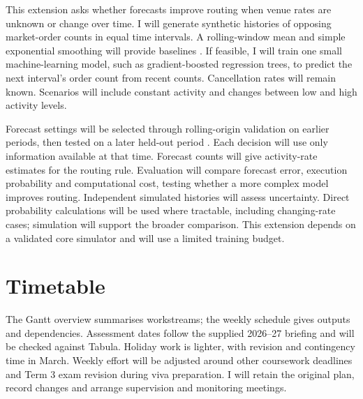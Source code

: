\documentclass[10pt,a4paper,oneside]{article}
\begin{document}
This extension asks whether forecasts improve routing when venue rates are unknown or change over time. I will generate synthetic histories of opposing market-order counts in equal time intervals. A rolling-window mean and simple exponential smoothing will provide baselines \cite{hyndman2021}. If feasible, I will train one small machine-learning model, such as gradient-boosted regression trees, to predict the next interval's order count from recent counts. Cancellation rates will remain known. Scenarios will include constant activity and changes between low and high activity levels.

Forecast settings will be selected through rolling-origin validation on earlier periods, then tested on a later held-out period \cite{hyndman2021}. Each decision will use only information available at that time. Forecast counts will give activity-rate estimates for the routing rule. Evaluation will compare forecast error, execution probability and computational cost, testing whether a more complex model improves routing. Independent simulated histories will assess uncertainty. Direct probability calculations will be used where tractable, including changing-rate cases; simulation will support the broader comparison. This extension depends on a validated core simulator and will use a limited training budget.

\section{Timetable}

The Gantt overview summarises workstreams; the weekly schedule gives outputs and dependencies. Assessment dates follow the supplied 2026--27 briefing and will be checked against Tabula. Holiday work is lighter, with revision and contingency time in March. Weekly effort will be adjusted around other coursework deadlines and Term 3 exam revision during viva preparation. I will retain the original plan, record changes and arrange supervision and monitoring meetings.
\end{document}
